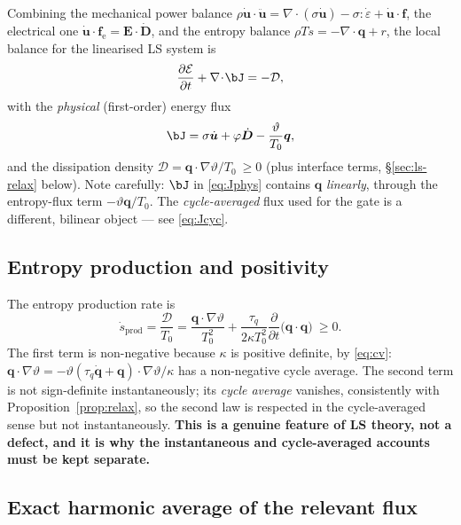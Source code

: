\documentclass[11pt]{article}
\newcommand{\s}{\sigma}
\newcommand{\eps}{\varepsilon}
\newcommand{\bth}{\vartheta}
\newcommand{\D}{\bm{D}}
\newcommand{\E}{\bm{E}}
\newcommand{\bu}{\bm{u}}
\newcommand{\bq}{\bm{q}}
\theoremstyle{plain}
\begin{document}
Combining the mechanical power balance
$\rho\dot{\bu}\!\cdot\!\ddot{\bu}=\nabla\!\cdot\!(\s\dot{\bu})
-\s\!:\!\dot{\eps}+\dot{\bu}\!\cdot\!\mathbf f$, the electrical one
$\dot{\bu}\!\cdot\!\mathbf f_{\mathrm e}=\E\!\cdot\!\dot{\D}$, and the entropy
balance $\rho T\dot s=-\nabla\!\cdot\!\bq+r$, the local balance for the
linearised LS system is
\begin{equation}
\frac{\partial\mathcal E}{\partial t}+\nabla\!\cdot\!\bJ=-\mathcal D ,
\label{eq:local}
\end{equation}
with the \emph{physical} (first-order) energy flux
\begin{equation}
\bJ=\s\dot{\bu}+\varphi\dot{\D}-\frac{\bth}{T_0}\bq ,
\label{eq:Jphys}
\end{equation}
and the dissipation density
$\mathcal D=\bq\!\cdot\!\nabla\bth/T_0\ \ge 0$
(plus interface terms, \S\ref{sec:ls-relax} below).
Note carefully: $\bJ$ in \eqref{eq:Jphys} contains $\bq$ \emph{linearly}, through
the entropy-flux term $-\bth\bq/T_0$. The \emph{cycle-averaged} flux used for the
gate is a different, bilinear object --- see \eqref{eq:Jcyc}.

\subsection{Entropy production and positivity}

The entropy production rate is
\begin{equation}
\dot s_{\mathrm{prod}}=\frac{\mathcal D}{T_0}
=\frac{\bq\!\cdot\!\nabla\bth}{T_0^2}+\frac{\tau_q}{2\kappa T_0^2}
\frac{\partial}{\partial t}\bigl(\bq\!\cdot\!\bq\bigr)\ \ge 0 .
\label{eq:sprod}
\end{equation}
The first term is non-negative because $\kappa$ is positive definite, by
\eqref{eq:cv}: $\bq\!\cdot\!\nabla\bth
=-\bth(\tau_q\dot{\bq}+\bq)\!\cdot\!\nabla\bth/\kappa$ has a non-negative
cycle average. The second term is not sign-definite instantaneously; its
\emph{cycle average} vanishes, consistently with Proposition~\ref{prop:relax},
so the second law is respected in the cycle-averaged sense but not
instantaneously. \textbf{This is a genuine feature of LS theory, not a defect,
and it is why the instantaneous and cycle-averaged accounts must be kept
separate.}

\subsection{Exact harmonic average of the relevant flux}
\end{document}

